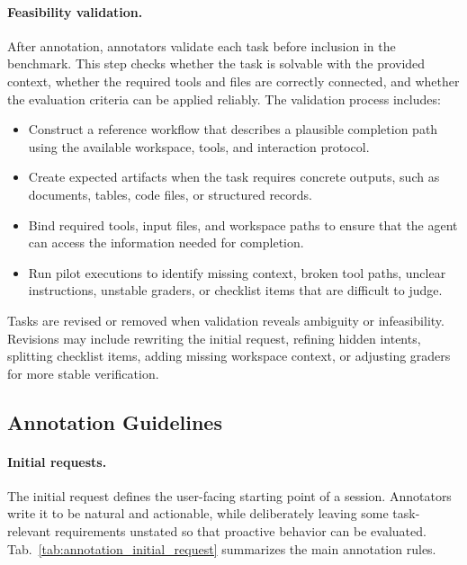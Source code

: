\paragraph{Feasibility validation.}
After annotation, annotators validate each task before inclusion in the benchmark. This step checks whether the task is solvable with the provided context, whether the required tools and files are correctly connected, and whether the evaluation criteria can be applied reliably. The validation process includes:
\begin{itemize}[leftmargin=10pt, topsep=0pt, itemsep=1pt, partopsep=1pt, parsep=1pt]
    \item Construct a reference workflow that describes a plausible completion path using the available workspace, tools, and interaction protocol.
    \item Create expected artifacts when the task requires concrete outputs, such as documents, tables, code files, or structured records.
    \item Bind required tools, input files, and workspace paths to ensure that the agent can access the information needed for completion.
    \item Run pilot executions to identify missing context, broken tool paths, unclear instructions, unstable graders, or checklist items that are difficult to judge.
\end{itemize}
Tasks are revised or removed when validation reveals ambiguity or infeasibility. Revisions may include rewriting the initial request, refining hidden intents, splitting checklist items, adding missing workspace context, or adjusting graders for more stable verification.

\subsection{Annotation Guidelines}
\label{app:annotation_guidelines}

\paragraph{Initial requests.}
The initial request defines the user-facing starting point of a session. Annotators write it to be natural and actionable, while deliberately leaving some task-relevant requirements unstated so that proactive behavior can be evaluated. Tab.~\ref{tab:annotation_initial_request} summarizes the main annotation rules.



